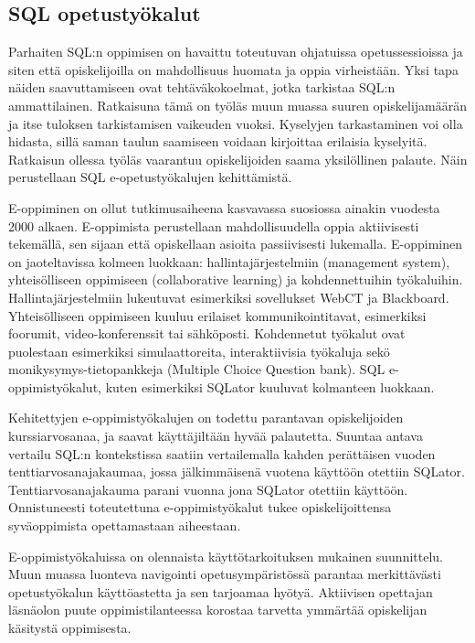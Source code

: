 \documentclass[finnish,twoside,openright]{HYgraduMLDS}
\begin{document}
\subsection{SQL opetustyökalut}

Parhaiten SQL:n oppimisen on havaittu toteutuvan ohjatuissa opetussessioissa ja siten että opiskelijoilla on mahdollisuus huomata ja oppia virheistään\cite{sadiq2004sqlator}. Yksi tapa näiden saavuttamiseen ovat tehtäväkokoelmat, jotka tarkistaa SQL:n ammattilainen. Ratkaisuna tämä on työläs muun muassa suuren opiskelijamäärän ja itse tuloksen tarkistamisen vaikeuden vuoksi. Kyselyjen tarkastaminen voi olla hidasta, sillä saman taulun saamiseen voidaan kirjoittaa erilaisia kyselyitä. Ratkaisun ollessa työläs vaarantuu opiskelijoiden saama yksilöllinen palaute. Näin perustellaan SQL e-opetustyökalujen kehittämistä.

E-oppiminen on ollut tutkimusaiheena kasvavassa suosiossa ainakin vuodesta 2000 alkaen. E-oppimista perustellaan mahdollisuudella oppia aktiivisesti tekemällä, sen sijaan että opiskellaan asioita passiivisesti lukemalla. E-oppiminen on jaoteltavissa kolmeen luokkaan\cite{sadiq2004sqlator}: hallintajärjestelmiin (management system), yhteisölliseen oppimiseen (collaborative learning) ja kohdennettuihin työkaluihin. Hallintajärjestelmiin lukeutuvat esimerkiksi sovellukset WebCT ja Blackboard. Yhteisölliseen oppimiseen kuuluu erilaiset kommunikointitavat, esimerkiksi foorumit, video-konferenssit tai sähköposti. Kohdennetut työkalut ovat puolestaan esimerkiksi simulaattoreita, interaktiivisia työkaluja sekö monikysymys-tietopankkeja (Multiple Choice Question bank). SQL e-oppimistyökalut, kuten esimerkiksi SQLator kuuluvat kolmanteen luokkaan.

Kehitettyjen e-oppimistyökalujen on todettu parantavan opiskelijoiden kurssiarvosanaa, ja saavat käyttäjiltään hyvää palautetta\cite{Brusilovsky:2010:LSP:1656255.1656257}. Suuntaa antava vertailu SQL:n kontekstissa saatiin vertailemalla kahden perättäisen vuoden tenttiarvosanajakaumaa, jossa jälkimmäisenä vuotena käyttöön otettiin SQLator\cite{sadiq2004sqlator}. Tenttiarvosanajakauma parani vuonna jona SQLator otettiin käyttöön. Onnistuneesti toteutettuna e-oppimistyökalut tukee opiskelijoittensa syväoppimista opettamastaan aiheestaan\cite{sadiq2004sqlator}. 

E-oppimistyökaluissa on olennaista käyttötarkoituksen mukainen suunnittelu. Muun muassa luonteva navigointi opetusympäristössä parantaa merkittävästi opetustyökalun käyttöastetta ja sen tarjoamaa hyötyä\cite{Brusilovsky:2010:LSP:1656255.1656257}. Aktiivisen opettajan läsnäolon puute oppimistilanteessa korostaa tarvetta ymmärtää opiskelijan käsitystä oppimisesta\cite{sadiq2004sqlator}.
\end{document}
